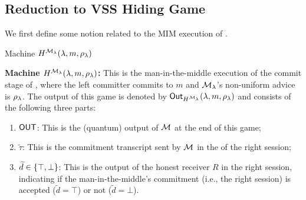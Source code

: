


\subsection{Reduction to VSS Hiding Game}
\label{sec:pq-nmc:1-1:proof:reduction-to-hiding}

We first define some notion related to the MIM execution of .
\begin{AlgorithmBox}[label={pq:gameH:description}]{Machine \textnormal{$H^{\mathcal{M}_\lambda}(\lambda,m,\rho_\lambda)$}}

{\bf Machine $H^{\mathcal{M}_\lambda}(\lambda,m,\rho_\lambda)$:} This is the man-in-the-middle execution of the commit stage of , where the left committer commits to $m$ and $\mathcal{M}_\lambda$'s non-uniform advice is $\rho_\lambda$. The output of this game is denoted by $\mathsf{Out}_{H^{\mathcal{M}_\lambda}}(\lambda, m, \rho_\lambda)$ and consists of the following three parts:
\begin{enumerate}
\item
$\mathsf{OUT}$: This is the (quantum) output of $\mathcal{M}$ at the end of this game;
\item
$\tilde{\tau}$: This is the commitment transcript sent by $\mathcal{M}$ in the  of the right session;
\item
$\widetilde{d} \in \{\top, \bot\}$: This is the output of the honest receiver $R$ in the right session, indicating if the man-in-the-middle's commitment (i.e., the right session) is accepted ($\tilde{d} = \top$) or not ($\tilde{d} = \bot$).
\end{enumerate} 
\end{AlgorithmBox}


